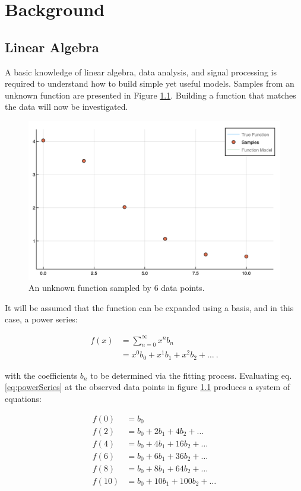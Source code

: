 \chapter{Background}\label{Sect:background}
\section{Linear Algebra}\label{Sect:linearAlgebra}
A basic knowledge of linear algebra, data analysis, and signal processing is required to understand how to build simple yet useful models. Samples from an unknown function are presented in Figure \ref{fig:func1Samples}. Building a function that matches the data will now be investigated.

\begin{figure}%
\centering
\includegraphics[scale = 0.6]{Figures/func1Samples}
\caption{An unknown function sampled by 6 data points.
\label{fig:func1Samples}} 
\end{figure}

\par It will be assumed that the function can be expanded using a basis, and in this case, a power series:

\begin{align}
f(x) &= \sum_{n=0}^\infty x^n b_n
	\label{eq:powerSum}\\ 
&= x^0b_0 + x^1b_1 + x^2b_2 + \ldots\ .
	\label{eq:powerSeries}
\end{align}

with the coefficients $b_n$ to be determined via the fitting process. Evaluating eq. \ref{eq:powerSeries} at the observed data points in figure \ref{fig:func1Samples} produces a system of equations:

\begin{align}
f(0) &= b_0 \nonumber \\
f(2) &= b_0 + 2 b_1 + 4 b_2 + \dots \nonumber \\
f(4) &= b_0 + 4 b_1 + 16 b_2 + \dots \nonumber \\
f(6) &= b_0 + 6 b_1 + 36 b_2 + \dots \nonumber \\
f(8) &= b_0 + 8 b_1 + 64 b_2 + \dots \nonumber \\
f(10) &= b_0 + 10 b_1 + 100 b_2 + \dots\\
\end{align}

